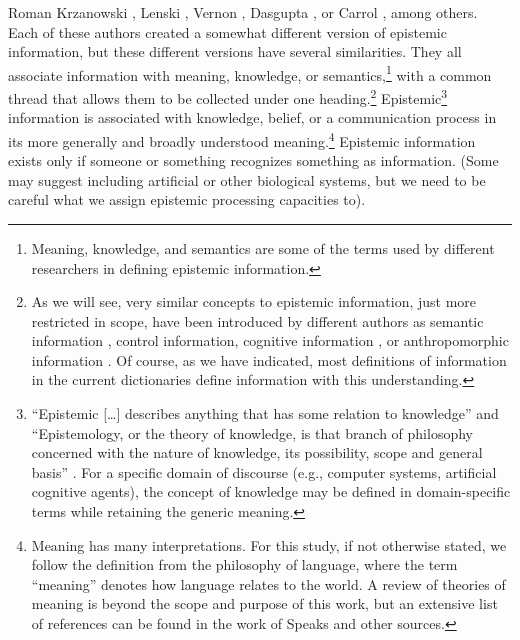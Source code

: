 \begin{artengenv}{Roman Krzanowski}
\parencite*[][]{burgin_information_2003}, %
 Lenski 
\parencite*[][]{lenski_information_2010}, %
 Vernon 
\parencite*[][]{vernon_artificial_2014}, %
 Dasgupta 
\parencite*[][]{dasgupta_computer_2016}, %
 or Carrol 
\parencite*[][]{carroll_big_2017}, %
 among others. Each of these authors created a somewhat different version of epistemic information, but these different versions have several similarities. They all associate information with meaning, knowledge, or semantics,\footnote{Meaning, knowledge, and semantics are some of the terms used by different researchers in defining epistemic information.} with a common thread that allows them to be collected under one heading.\footnote{As we will see, very similar concepts to epistemic information, just more restricted in scope, have been introduced by different authors as semantic information 
\parencites[e.g.][]{bar-hillel_semantic_1953}[][]{dretske_knowledge_1999}, %
 control information, cognitive information 
\parencite[][]{hanson_intrinsic_1990}, %
 or anthropomorphic information 
\parencite[][]{heller_na_2005}. %
 Of course, as we have indicated, most definitions of information in the current dictionaries define information with this understanding.} Epistemic\footnote{``Epistemic […] describes anything that has some relation to knowledge'' and ``Epistemology, or the theory of knowledge, is that branch of philosophy concerned with the nature of knowledge, its possibility, scope and general basis'' 
\parencite[][]{honderich_oxford_1995}. %
 For a specific domain of discourse (e.g., computer systems, artificial cognitive agents), the concept of knowledge may be defined in domain-specific terms while retaining the generic meaning.} information is associated with knowledge, belief, or a communication process in its more generally and broadly understood meaning.\footnote{Meaning has many interpretations. For this study, if not otherwise stated, we follow the definition from the philosophy of language, where the term ``meaning'' denotes how language relates to the world. A review of theories of meaning is beyond the scope and purpose of this work, but an extensive list of references can be found in the work of Speaks 
\parencite*[][]{speaks_theories_2018} %
 and other sources. } Epistemic information exists only if someone or something recognizes something as information. (Some may suggest including artificial or other biological systems, but we need to be careful what we assign epistemic processing capacities to).


\end{artengenv}
